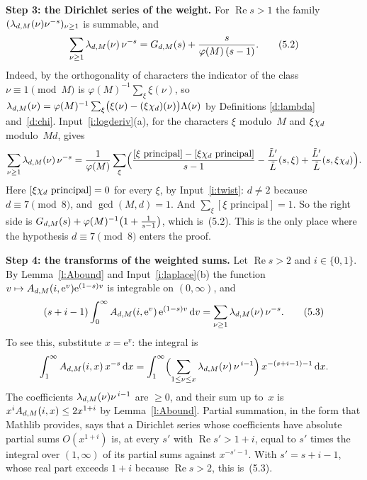 \documentclass[11pt,a4paper]{article}
\newcommand{\subhead}[1]{\par\addvspace{9pt plus 2pt}\Needspace{4\baselineskip}\noindent\textbf{#1}\enspace\ignorespaces}
\theoremstyle{plainx}
\theoremstyle{uprightx}
\newcommand{\ee}{\mathrm{e}}
\newcommand{\dd}{\mathrm{d}}
\newcommand{\re}{\operatorname{Re}}
\newcommand{\Ltd}[2]{\frac{\tilde L'}{\tilde L}(#1,#2)}
\newcommand{\iv}[1]{[#1\text{ principal}]}
\begin{document}
\subhead{Step 3: the Dirichlet series of the weight.} For $\re s>1$ the family
$(\lambda_{d,M}(\nu)\nu^{-s})_{\nu\ge1}$ is summable, and
\[
\sum_{\nu\ge1}\lambda_{d,M}(\nu)\,\nu^{-s}=G_{d,M}(s)+\frac{s}{\varphi(M)\,(s-1)}.
\tag{5.2}
\]
Indeed, by the orthogonality of characters the indicator of the class $\nu\equiv1\pmod M$ is
$\varphi(M)^{-1}\sum_\xi\xi(\nu)$, so
$\lambda_{d,M}(\nu)=\varphi(M)^{-1}\sum_\xi\bigl(\xi(\nu)-(\xi\chi_{d})(\nu)\bigr)\Lambda(\nu)$ by
Definitions \ref{d:lambda} and~\ref{d:chi}. Input~\ref{i:logderiv}(a), for the characters $\xi$ modulo~$M$ and
$\xi\chi_{d}$ modulo~$Md$, gives
\[
\sum_{\nu\ge1}\lambdaClass{d}{M}{\nu}\,\nu^{-s}
=\frac1{\varphi(M)}\sum_\xi\Bigl(\frac{\iv{\xi}-\iv{\quadTwist{\xi}{d}}}{s-1}-\Ltd{s}{\xi}+\Ltd{s}{\quadTwist{\xi}{d}}\Bigr).
\]
Here $\iv{\quadTwist{\xi}{d}}=0$ for every $\xi$, by Input~\ref{i:twist}: $d\ne2$ because $d\equiv7\pmod 8$, and
$\gcd(M,d)=1$. And $\sum_\xi\iv{\xi}=1$. So the right side is
$G_{d,M}(s)+\varphi(M)^{-1}\bigl(1+\frac1{s-1}\bigr)$, which is~(5.2). This is the only place where the
hypothesis $d\equiv7\pmod8$ enters the proof.

\subhead{Step 4: the transforms of the weighted sums.} Let $\re s>2$ and $i\in\{0,1\}$. By Lemma~\ref{l:Abound} and
Input~\ref{i:laplace}(b) the function $v\mapsto\lambdaSum{d}{M}{i}{\ee^{v}}\ee^{(1-s)v}$ is integrable on
$(0,\infty)$, and
\[
(s+i-1)\int_0^\infty\lambdaSum{d}{M}{i}{\ee^{v}}\,\ee^{(1-s)v}\,\dd v=\sum_{\nu\ge1}\lambdaClass{d}{M}{\nu}\,\nu^{-s}.
\tag{5.3}
\]
To see this, substitute $x=\ee^{v}$: the integral is
\[
\int_1^\infty\lambdaSum{d}{M}{i}{x}\,x^{-s}\,\dd x
=\int_1^\infty\Bigl(\sum_{1\le\nu\le x}\lambdaClass{d}{M}{\nu}\,\nu^{\,i-1}\Bigr)\,x^{-(s+i-1)-1}\,\dd x .
\]
The coefficients
$\lambda_{d,M}(\nu)\nu^{\,i-1}$ are $\ge0$, and their sum up to~$x$ is $x^{i}A_{d,M}(i,x)\le2x^{1+i}$ by
Lemma~\ref{l:Abound}. Partial summation, in the form that Mathlib provides, says that a Dirichlet series whose
coefficients have absolute partial sums $O(x^{1+i})$ is, at every $s'$ with $\re s'>1+i$, equal to $s'$ times the
integral over $(1,\infty)$ of its partial sums against $x^{-s'-1}$. With $s'=s+i-1$, whose real part exceeds $1+i$
because $\re s>2$, this is~(5.3).
\end{document}
